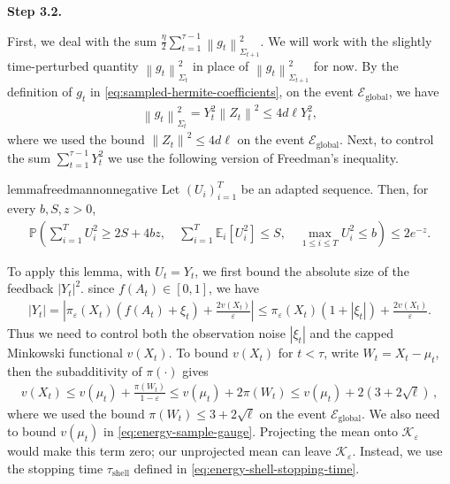 \documentclass{article}
\newcommand{\proofstepinline}[1]{%
    {\normalfont\normalsize\bfseries\color{blue!55!black}Step #1.}\enspace
}
\newcommand{\E}{\mathbb E}
\newcommand{\Pp}{\mathbb P}
\newcommand{\K}{\mathcal K}
\newcommand{\1}{\mathbf 1}
\newcommand{\eps}{\varepsilon}
\newcommand{\norm}[1]{\left\lVert #1\right\rVert}
\newcommand{\normm}[2]{\left\lVert #1\right\rVert_{#2}}
\begin{document}
\proofstepinline{3.2}
First, we deal with the sum $\frac{\eta}{2}\sum_{t=1}^{\tau - 1}\normm{g_t}{\Sigma_{t+1}}^2$.
We will work with the slightly time-perturbed quantity $\normm{g_t}{\Sigma_{t}}^2$ in place of $\normm{g_t}{\Sigma_{t+1}}^2$ for now.
By the definition of $g_t$ in \eqref{eq:sampled-hermite-coefficients},
on the event $\mathcal E_{\mathrm{global}}$, we have
\begin{align}
    \normm{g_t}{\Sigma_t}^2
    =Y_t^2\norm{Z_t}^2
    \leq
    4d\ell Y_t^2
    ,
    \label{eq:energy-feedback-identity}
\end{align}
where we used the bound $\norm{Z_t}^2\leq 4d\ell$ on the event $\mathcal E_{\mathrm{global}}$.
Next, to control the sum $\sum_{t=1}^{\tau-1}Y_t^2$ we use the following version of Freedman's inequality.
\begin{restatable}{lemma}{freedmannonnegative}
    \label{lem:freedman-nonnegative}
    Let $(U_i)_{i=1}^T$ be an adapted sequence.
    Then, for every $b,S,z>0$,
    \begin{align}
        \Pp\left(
        \sum_{i=1}^T U_i^2
        \geq 2S+4bz,
        \quad
        \sum_{i=1}^T\E_i[U_i^2]\leq S,
        \quad
        \max_{1\leq i\leq T}U_i^2\leq b
        \right)
        \leq2e^{-z}.
        \label{eq:freedman-nonnegative}
    \end{align}
\end{restatable}
To apply this lemma, with $U_t=Y_t$, we first bound the absolute size of the feedback $|Y_t|^2$.
since $f(A_t)\in[0,1]$, we have
\begin{align}
    |Y_t|=\left|\pi_\eps(X_t)(f(A_t)+\xi_t)+\frac{2v(X_t)}{\eps}\right|
    \leq
    \pi_\eps(X_t)(1+|\xi_t|)+\frac{2v(X_t)}{\eps}.
    \label{eq:energy-feedback-decomposition}
\end{align}
Thus we need to control both the observation noise $|\xi_t|$ and the capped Minkowski functional $v(X_t)$.
To bound $v(X_t)$ for $t < \tau$, write $W_t=X_t-\mu_t$, then the subadditivity of $\pi(\cdot)$ gives
\begin{align}
    v(X_t)\leq v(\mu_t)+\frac{\pi(W_t)}{1-\eps}
    \leq v(\mu_t)+2\pi(W_t)
    \leq v(\mu_t)+2(3 + 2\sqrt\ell)
    \,,
    \label{eq:energy-sample-gauge}
\end{align}
where we used the bound $\pi(W_t)\leq 3 + 2\sqrt\ell$ on the event $\mathcal E_{\mathrm{global}}$.
We also need to bound $v(\mu_t)$ in \eqref{eq:energy-sample-gauge}.
Projecting the mean onto $\K_\eps$ would make this term zero; our unprojected mean can leave $\K_\eps$.
Instead, we use the stopping time $\tau_{\mathrm{shell}}$ defined in \eqref{eq:energy-shell-stopping-time}.
\end{document}
